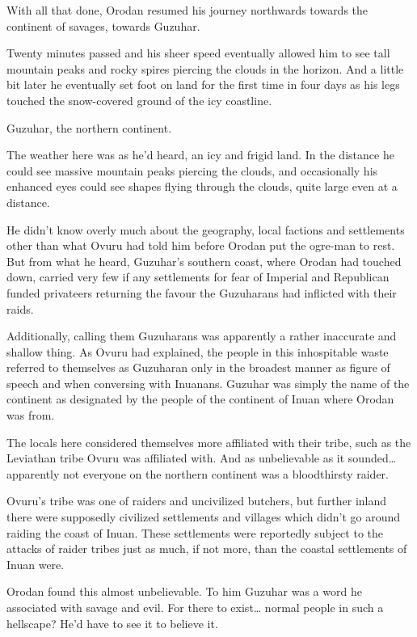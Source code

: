 \documentclass[a4paper,10pt]{book}
\begin{document}
With all that done, Orodan resumed his journey northwards towards the continent of savages, towards Guzuhar.\par
Twenty minutes passed and his sheer speed eventually allowed him to see tall mountain peaks and rocky spires piercing the clouds in the horizon. And a little bit later he eventually set foot on land for the first time in four days as his legs touched the snow-covered ground of the icy coastline.\par
Guzuhar, the northern continent.\par
The weather here was as he’d heard, an icy and frigid land. In the distance he could see massive mountain peaks piercing the clouds, and occasionally his enhanced eyes could see shapes flying through the clouds, quite large even at a distance.\par
He didn’t know overly much about the geography, local factions and settlements other than what Ovuru had told him before Orodan put the ogre-man to rest. But from what he heard, Guzuhar’s southern coast, where Orodan had touched down, carried very few if any settlements for fear of Imperial and Republican funded privateers returning the favour the Guzuharans had inflicted with their raids.\par
Additionally, calling them Guzuharans was apparently a rather inaccurate and shallow thing. As Ovuru had explained, the people in this inhospitable waste referred to themselves as Guzuharan only in the broadest manner as figure of speech and when conversing with Inuanans. Guzuhar was simply the name of the continent as designated by the people of the continent of Inuan where Orodan was from.\par
The locals here considered themselves more affiliated with their tribe, such as the Leviathan tribe Ovuru was affiliated with. And as unbelievable as it sounded… apparently not everyone on the northern continent was a bloodthirsty raider.\par
Ovuru’s tribe was one of raiders and uncivilized butchers, but further inland there were supposedly civilized settlements and villages which didn’t go around raiding the coast of Inuan. These settlements were reportedly subject to the attacks of raider tribes just as much, if not more, than the coastal settlements of Inuan were.\par
Orodan found this almost unbelievable. To him Guzuhar was a word he associated with savage and evil. For there to exist… normal people in such a hellscape? He’d have to see it to believe it.\par
\end{document}
